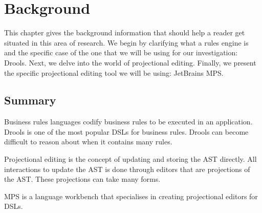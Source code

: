 \chapter{Background}
\label{chapter:Background}

This chapter gives the background information that should help a reader get situated in this area of research.
We begin by clarifying what a rules engine is and the specific case of the one that we will be using for our investigation: Drools.
Next, we delve into the world of projectional editing.
Finally, we present the specific projectional editing tool we will be using: JetBrains MPS.





\section{Summary}
Business rules languages codify business rules to be executed in an application.
Drools is one of the most popular DSLs for business rules.
Drools can become difficult to reason about when it contains many rules.

Projectional editing is the concept of updating and storing the AST directly.
All interactions to update the AST is done through editors that are projections of the AST.
These projections can take many forms.

MPS is a language workbench that specialises in creating projectional editors for DSLs.